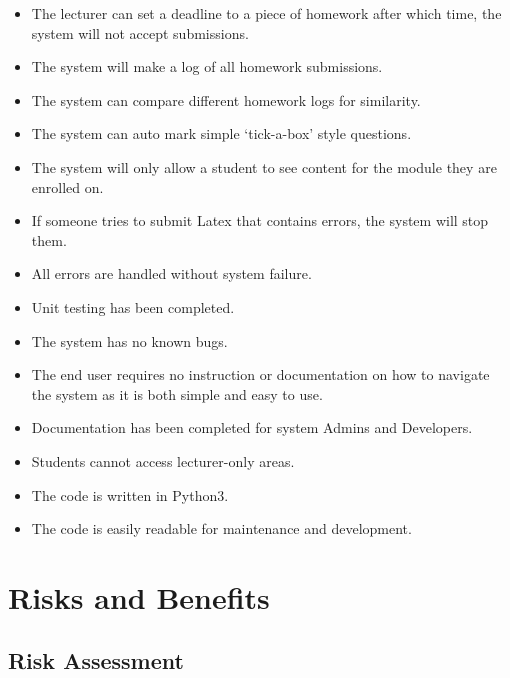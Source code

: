 \documentclass[12pt]{article}
\begin{document}
	    \begin{itemize}
			\item The lecturer can set a deadline to a piece of homework after which time, the system will not accept submissions.
			\item The system will make a log of all homework submissions.
			\item The system can compare different homework logs for similarity.
			\item The system can auto mark simple ‘tick-a-box’ style questions.
			\item The system will only allow a student to see content for the module they are enrolled on.
			\item If someone tries to submit Latex that contains errors, the system will stop them.
			\item All errors are handled without system failure.
			\item Unit testing has been completed.
			\item The system has no known bugs.
			\item The end user requires no instruction or documentation on how to navigate the system as it is both simple and easy to use.
			\item Documentation has been completed for system Admins and Developers.
			\item Students cannot access lecturer-only areas.
			\item The code is written in Python3.
			\item The code is easily readable for maintenance and development.
		\end{itemize}

          	
	\section{Risks and Benefits}
		\subsection{Risk Assessment}
			
			
			
			
\end{document}
